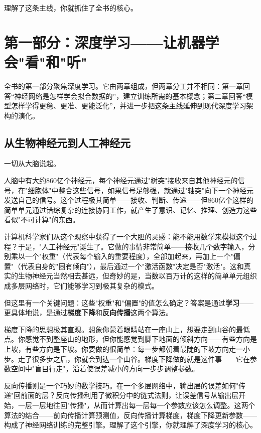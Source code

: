 \documentclass[lang=cn,zihao=-4,a4paper,fontset=windows]{beautybook}
\begin{document}
{理解了这条主线，你就抓住了全书的核心。

\section*{第一部分：深度学习——让机器学会"看"和"听"}

全书的第一部分聚焦深度学习。它由两章组成，但两章分工并不相同：第一章回答“神经网络是怎样学会拟合数据的”，建立训练所需的基本概念；第二章回答“模型怎样学得更稳、更准、更能泛化”，并进一步把这条主线延伸到现代深度学习架构的演化。

\subsection*{从生物神经元到人工神经元}

一切从大脑说起。

人脑中有大约860亿个神经元，每个神经元通过"树突"接收来自其他神经元的信号，在"细胞体"中整合这些信号，如果信号足够强，就通过"轴突"向下一个神经元发送自己的信号。这个过程极其简单——接收、判断、传递——但860亿个这样的简单单元通过错综复杂的连接协同工作，就产生了意识、记忆、推理、创造力这些看似"不可计算"的东西。

计算机科学家们从这个观察中获得了一个大胆的灵感：能不能用数学来模拟这个过程？于是，"人工神经元"诞生了。它做的事情非常简单——接收几个数字输入，分别乘以一个"权重"（代表每个输入的重要程度），全部加起来，再加上一个"偏置"（代表自身的"固有倾向"），最后通过一个"激活函数"决定是否"激活"。这和真实的生物神经元当然相去甚远，但奇妙的是，当数以百万计的这样的简单单元组织成多层网络时，它们能够学习到极其复杂的模式。

但这里有一个关键问题：这些"权重"和"偏置"的值怎么确定？答案是通过\textbf{学习}——更具体地说，是通过\textbf{梯度下降}和\textbf{反向传播}这两个算法。

梯度下降的思想极其直观。想象你蒙着眼睛站在一座山上，想要走到山谷的最低点。你感觉不到整座山的地形，但你能感觉到脚下地面的倾斜方向——有些方向是上坡，有些方向是下坡。你要做的很简单：每一步都朝着最陡的下坡方向走一小步。走了很多步之后，你就会到达一个山谷。梯度下降做的就是这件事——它在参数空间中"盲目行走"，沿着使误差减小的方向一步步调整参数。

反向传播则是一个巧妙的数学技巧。在一个多层网络中，输出层的误差如何"传递"回前面的层？反向传播利用了微积分中的链式法则，让误差信号从输出层开始，一层一层地往回"传播"，从而计算出每一层每一个参数应该怎么调整。这两个算法的结合——前向传播计算预测值，反向传播计算梯度，梯度下降更新参数——构成了神经网络训练的完整引擎。理解了这个引擎，你就理解了深度学习的核心。

}
\end{document}
